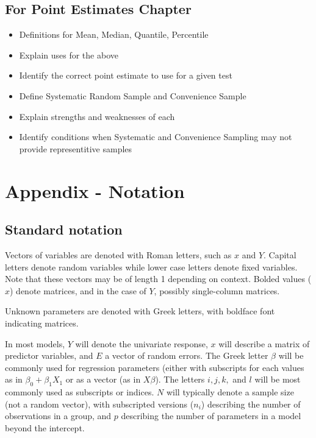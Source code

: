 \documentclass[
]{book}
\theoremstyle{definition}
\theoremstyle{definition}
\theoremstyle{definition}
\theoremstyle{remark}
\begin{document}
\hypertarget{for-point-estimates-chapter}{%
\section{For Point Estimates Chapter}\label{for-point-estimates-chapter}}

\begin{itemize}
\item
  Definitions for Mean, Median, Quantile, Percentile
\item
  Explain uses for the above
\item
  Identify the correct point estimate to use for a given test
\item
  Define Systematic Random Sample and Convenience Sample
\item
  Explain strengths and weaknesses of each
\item
  Identify conditions when Systematic and Convenience Sampling may not provide representitive samples
\end{itemize}

\hypertarget{notation}{%
\chapter{Appendix - Notation}\label{notation}}

\hypertarget{standard-notation}{%
\section{Standard notation}\label{standard-notation}}

Vectors of variables are denoted with Roman letters, such as \(x\) and \(Y\). Capital letters denote random variables while lower case letters denote fixed variables. Note that these vectors may be of length 1 depending on context. Bolded values (\textbf{\(x\)}) denote matrices, and in the case of \textbf{\(Y\)}, possibly single-column matrices.

Unknown parameters are denoted with Greek letters, with boldface font indicating matrices.

In most models, \(Y\) will denote the univariate response, \textbf{\(x\)} will describe a matrix of predictor variables, and \(E\) a vector of random errors. The Greek letter \(\beta\) will be commonly used for regression parameters (either with subscripts for each values as in \(\beta_0 + \beta_1 X_1\) or as a vector (as in \(X\beta\)). The letters \(i, j, k,\) and \(l\) will be most commonly used as subscripts or indices. \(N\) will typically denote a sample size (not a random vector), with subscripted versions (\(n_i\)) describing the number of observations in a group, and \(p\) describing the number of parameters in a model beyond the intercept.
\end{document}
